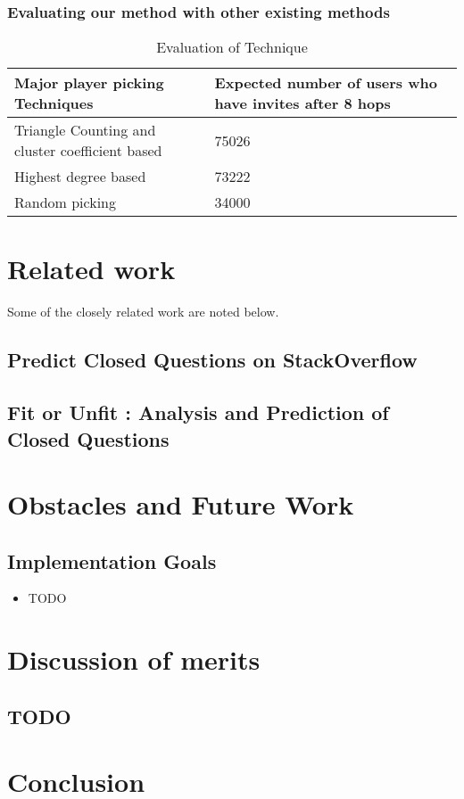 \documentclass[letterpaper,twocolumn,11pt]{article}
\begin{document}
\subsubsection{Evaluating our method with other existing methods}


\begin{table*}[ht] 
\centering
\begin{tabular}{ |p{12cm}|p{3cm} |}
\hline 
  Major player picking Techniques & Expected number of users who have invites after 8 hops\\
  \hline 
  Triangle Counting and cluster coefficient based & 75026\\
  \hline
  Highest degree based & 73222\\
  \hline
  Random picking & 34000 \\
  \hline
\end{tabular}
\caption{Evaluation of Technique} 
\label{tab:techeval} 
\end{table*}

\section{Related work}
Some of the closely related work are noted below.

\subsection{Predict Closed Questions on StackOverflow\cite{Lezina_predictclosed}}


\subsection{Fit or Unfit : Analysis and Prediction of Closed Questions\cite{DBLP:journals/corr/CorreaS13}}


\section{Obstacles and Future Work}
\subsection{Implementation Goals}
\begin{itemize}
\item TODO
\end{itemize}

\section{Discussion of merits}

\subsection{TODO}



\section{Conclusion}


{
\small 


}
\end{document}
